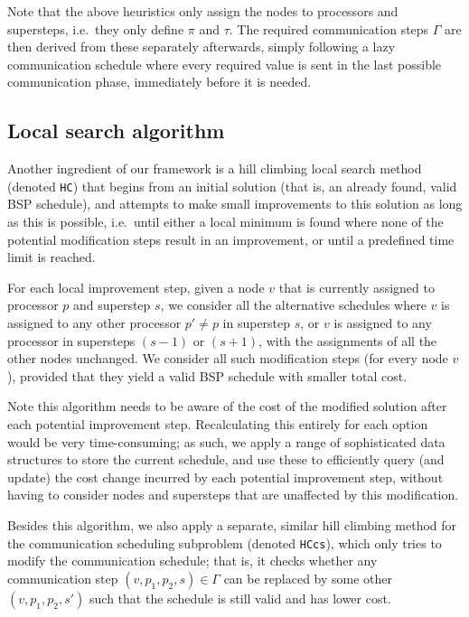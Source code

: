 \documentclass[sigconf,nonacm]{acmart}
\begin{document}
Note that the above heuristics only assign the nodes to processors and supersteps, i.e.\ they only define $\pi$ and $\tau$. The required communication steps $\Gamma$ are then derived from these separately afterwards, simply following a lazy communication schedule where every required value is sent in the last possible communication phase, immediately before it is needed.

\subsection{Local search algorithm}

Another ingredient of our framework is a hill climbing local search method (denoted \texttt{HC}) that begins from an initial solution (that is, an already found, valid BSP schedule), and attempts to make small improvements to this solution as long as this is possible, i.e.\ until either a local minimum is found where none of the potential modification steps result in an improvement, or until a predefined time limit is reached.

For each local improvement step, given a node $v$ that is currently assigned to processor $p$ and superstep $s$, we consider all the alternative schedules where $v$ is assigned to any other processor $p' \neq p$ in superstep $s$, or $v$ is assigned to any processor in supersteps $(s-1)$ or $(s+1)$, with the assignments of all the other nodes unchanged. We consider all such modification steps (for every node $v$), provided that they yield a valid BSP schedule with smaller total cost.

Note this algorithm needs to be aware of the cost of the modified solution after each potential improvement step. Recalculating this entirely for each option would be very time-consuming; as such, we apply a range of sophisticated data structures to store the current schedule, and use these to efficiently query (and update) the cost change incurred by each potential improvement step, without having to consider nodes and supersteps that are unaffected by this modification.

Besides this algorithm, we also apply a separate, similar hill climbing method for the communication scheduling subproblem (denoted \texttt{HCcs}), which only tries to modify the communication schedule; that is, it checks whether any communication step $(v, p_1, p_2, s) \in \Gamma$ can be replaced by some other $(v, p_1, p_2, s')$ such that the schedule is still valid and has lower cost.
\end{document}
